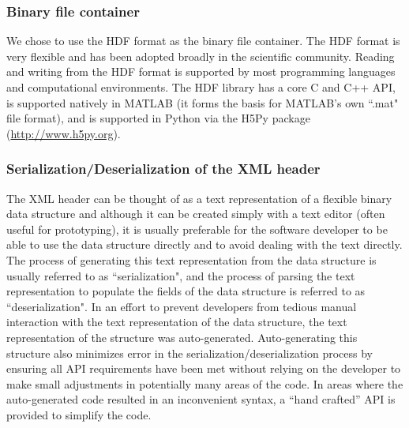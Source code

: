 \documentclass[12pt]{article}
\begin{document}
\subsubsection*{Binary file container}
We chose to use the HDF format as the binary file container.  The HDF format is very flexible and has been adopted broadly in the scientific community.  Reading and writing from the HDF format is supported by most programming languages and computational environments.  The HDF library has a core C and C++ API, is supported natively in MATLAB (it forms the basis for MATLAB's own ``.mat" file format), and is supported in Python via the H5Py package (\url{http://www.h5py.org}).

\subsubsection*{Serialization/Deserialization of the XML header}
The XML header can be thought of as a text representation of a flexible binary data structure and although it can be created simply with a text editor (often useful for prototyping), it is usually preferable for the software developer to be able to use the data structure directly and to avoid dealing with the text directly.  
The process of generating this text representation from the data structure is usually referred to as ``serialization", and the process of parsing the text representation to populate the fields of the data structure is referred to as ``deserialization".  
In an effort to prevent developers from tedious manual interaction with the text representation of the data structure, the text representation of the structure was auto-generated.
Auto-generating this structure also minimizes error in the serialization/deserialization process by ensuring all API requirements have been met without relying on the developer to make small adjustments in potentially many areas of the code.
In areas where the auto-generated code resulted in an inconvenient syntax, a ``hand crafted'' API is provided to simplify the code.
\end{document}
